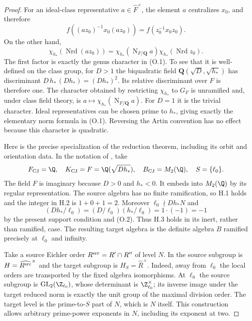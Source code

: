 \begin{proof}
For an ideal-class representative $a\in\widehat F^{\times}$,
the element $a$ centralizes $x_0$, and therefore
\[
 f((az_0)^{-1}x_0(az_0))=f(z_0^{-1}x_0z_0).
\]
On the other hand,
\[
 \chi_{h_*}(\operatorname{Nrd}(az_0))
 =\chi_{h_*}(\operatorname{N}_{F/\mathbf Q}a)
                    \chi_{h_*}(\operatorname{Nrd}z_0).
\]
The first factor is exactly the genus character in (O.1).
To see that it is well-defined on the class group, for $D>1$
the biquadratic field $\mathbf Q(\sqrt D,\sqrt{h_*})$ has
discriminant $D\,h_*\,(Dh_*)=(Dh_*)^2$. Its relative
discriminant over $F$ is therefore one. The character obtained
by restricting $\chi_{h_*}$ to $G_F$ is unramified and, under
class field theory, is $a\mapsto
\chi_{h_*}(\operatorname{N}_{F/\mathbf Q}a)$. For $D=1$ it
is the trivial character. Ideal representatives can be chosen
prime to $h_*$, giving exactly the elementary norm formula in
(O.1). Reversing the Artin convention has no effect because this
character is quadratic.

Here is the precise specialization of the reduction theorem, including
its orbit and orientation data. In the notation of
\cite[\S\S3.1--3.3]{cornutjetchev}, take
\[
 F_{\rm CJ}=\Q,\quad K_{\rm CJ}=F=\Q(\sqrt{Dh_*}),\quad
 B_{\rm CJ}=M_2(\Q),\quad S=\{\ell_0\}.
\]
The field $F$ is imaginary because $D>0$ and $h_*<0$.
It embeds into $M_2(\Q)$ by its regular representation. The source
algebra has no finite ramification, so H.1 holds and the integer
in H.2 is $1+0+1=2$. Moreover $\ell_0\nmid Dh_*N$ and
\[
  (Dh_*/\ell_0)=(D/\ell_0)(h_*/\ell_0)=1\cdot(-1)=-1
\]
by the present support condition and (O.2). Thus H.3 holds in its
inert, rather than ramified, case. The resulting target algebra is
the definite algebra $B$ ramified precisely at $\ell_0$ and infinity.

Take a source Eichler order $R^{\rm src}=R'\cap R''$ of level $N$.
In \cite[\S3.2]{cornutjetchev} the source subgroup is
$H=\widehat{R^{\rm src}}^{\times}$ and the target subgroup is
$H_S=\widehat R^{\times}$. Indeed, away from $\ell_0$ the local
orders are transported by the fixed algebra isomorphisms. At $\ell_0$
the source subgroup is $\operatorname{GL}_2(\Z_{\ell_0})$,
whose determinant is $\Z_{\ell_0}^{\times}$; its inverse image
under the target reduced norm is exactly the unit group of the
maximal division order. The target level is the prime-to-$S$ part
of $N$, which is $N$ itself. This construction allows arbitrary
prime-power exponents in $N$, including its exponent at two.


\end{proof}
